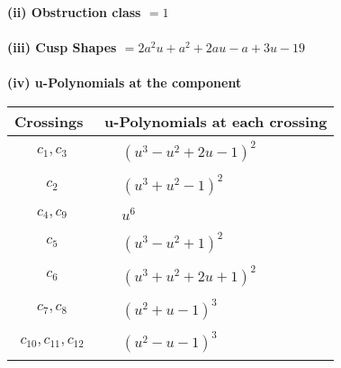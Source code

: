 \documentclass[1p]{elsarticle_modified}
\theoremstyle{definition}
\begin{document}
\flushleft \textbf{(ii) Obstruction class $= 1$}\\~\\
\flushleft \textbf{(iii) Cusp Shapes $= 2 a^2 u+a^2+2 a u- a+3 u-19$}\\~\\
\newpage\renewcommand{\arraystretch}{1}
\flushleft \textbf{(iv) u-Polynomials at the component}\newline \\
\begin{tabular}{m{50pt}|m{274pt}}
Crossings & \hspace{64pt}u-Polynomials at each crossing \\
\hline $$\begin{aligned}c_{1},c_{3}\end{aligned}$$&$\begin{aligned}
&(u^3- u^2+2 u-1)^2
\end{aligned}$\\
\hline $$\begin{aligned}c_{2}\end{aligned}$$&$\begin{aligned}
&(u^3+u^2-1)^2
\end{aligned}$\\
\hline $$\begin{aligned}c_{4},c_{9}\end{aligned}$$&$\begin{aligned}
&u^6
\end{aligned}$\\
\hline $$\begin{aligned}c_{5}\end{aligned}$$&$\begin{aligned}
&(u^3- u^2+1)^2
\end{aligned}$\\
\hline $$\begin{aligned}c_{6}\end{aligned}$$&$\begin{aligned}
&(u^3+u^2+2 u+1)^2
\end{aligned}$\\
\hline $$\begin{aligned}c_{7},c_{8}\end{aligned}$$&$\begin{aligned}
&(u^2+u-1)^3
\end{aligned}$\\
\hline $$\begin{aligned}c_{10},c_{11},c_{12}\end{aligned}$$&$\begin{aligned}
&(u^2- u-1)^3
\end{aligned}$\\
\hline
\end{tabular}\\~\\
\end{document}
